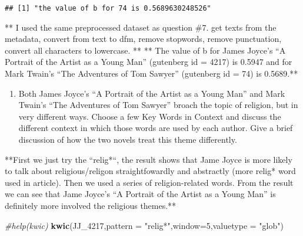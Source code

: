 \documentclass[]{article}
\newenvironment{Shaded}{\begin{snugshade}}{\end{snugshade}}
\newcommand{\KeywordTok}[1]{\textcolor[rgb]{0.13,0.29,0.53}{\textbf{#1}}}
\newcommand{\DataTypeTok}[1]{\textcolor[rgb]{0.13,0.29,0.53}{#1}}
\newcommand{\DecValTok}[1]{\textcolor[rgb]{0.00,0.00,0.81}{#1}}
\newcommand{\StringTok}[1]{\textcolor[rgb]{0.31,0.60,0.02}{#1}}
\newcommand{\CommentTok}[1]{\textcolor[rgb]{0.56,0.35,0.01}{\textit{#1}}}
\newcommand{\NormalTok}[1]{#1}
\providecommand{\tightlist}{%
  \setlength{\itemsep}{0pt}\setlength{\parskip}{0pt}}
\begin{document}
\begin{verbatim}
## [1] "the value of b for 74 is 0.5689630248526"
\end{verbatim}

** I used the same preprocessed dataset as question \#7. get texts from
the metadata, convert from text to dfm, remove stopwords, remove
punctuation, convert all characters to lowercase. ** ** The value of b
for James Joyce's ``A Portrait of the Artist as a Young Man'' (gutenberg
id = 4217) is 0.5947 and for Mark Twain's ``The Adventures of Tom
Sawyer'' (gutenberg id = 74) is 0.5689.**

\begin{enumerate}
\def\labelenumi{\arabic{enumi}.}
\setcounter{enumi}{8}
\tightlist
\item
  Both James Joyce's ``A Portrait of the Artist as a Young Man'' and
  Mark Twain's ``The Adventures of Tom Sawyer'' broach the topic of
  religion, but in very different ways. Choose a few Key Words in
  Context and discuss the different context in which those words are
  used by each author. Give a brief discussion of how the two novels
  treat this theme differently.
\end{enumerate}

**First we just try the ``relig*``, the result shows that Jame Joyce is
more likely to talk about religious/religon straightfowardly and
abstractly (more relig* word used in article). Then we used a series of
religion-related words. From the result we can see that Jame Joyce's ``A
Portrait of the Artist as a Young Man'' is definitely more involved the
religious themes.**

\begin{Shaded}
\begin{Highlighting}[]
\CommentTok{#help(kwic)}
\KeywordTok{kwic}\NormalTok{(JJ_}\DecValTok{4217}\NormalTok{,}\DataTypeTok{pattern =} \StringTok{"relig*"}\NormalTok{,}\DataTypeTok{window=}\DecValTok{5}\NormalTok{,}\DataTypeTok{valuetype =} \StringTok{"glob"}\NormalTok{)}
\end{Highlighting}
\end{Shaded}
\end{document}
